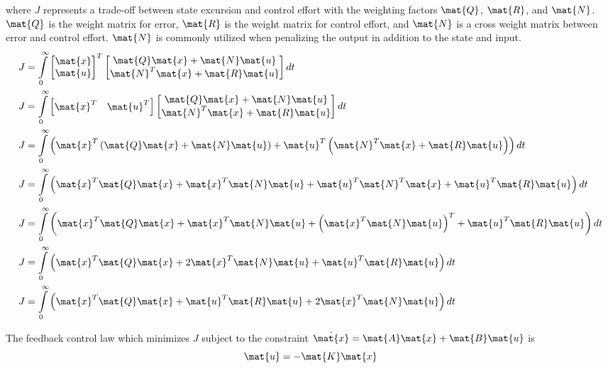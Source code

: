 where $J$ represents a trade-off between \gls{state} excursion and
\gls{control effort} with the weighting factors $\mat{Q}$, $\mat{R}$, and
$\mat{N}$. $\mat{Q}$ is the weight matrix for \gls{error}, $\mat{R}$ is the
weight matrix for \gls{control effort}, and $\mat{N}$ is a cross weight matrix
between \gls{error} and \gls{control effort}. $\mat{N}$ is commonly utilized
when penalizing the output in addition to the state and input.
\begin{align*}
  J &= \int\limits_0^\infty
    \begin{bmatrix}
      \mat{x} \\
      \mat{u}
    \end{bmatrix}^T
    \begin{bmatrix}
      \mat{Q}\mat{x} + \mat{N}\mat{u} \\
      \mat{N}^T\mat{x} + \mat{R}\mat{u}
    \end{bmatrix} dt \\
  J &= \int\limits_0^\infty
    \begin{bmatrix}
      \mat{x}^T & \mat{u}^T
    \end{bmatrix}
    \begin{bmatrix}
      \mat{Q}\mat{x} + \mat{N}\mat{u} \\
      \mat{N}^T\mat{x} + \mat{R}\mat{u}
    \end{bmatrix} dt \\
  J &= \int\limits_0^\infty
    \left(\mat{x}^T\left(\mat{Q}\mat{x} + \mat{N}\mat{u}\right) +
      \mat{u}^T\left(\mat{N}^T\mat{x} + \mat{R}\mat{u}\right)\right) dt \\
  J &= \int\limits_0^\infty
    \left(\mat{x}^T\mat{Q}\mat{x} + \mat{x}^T\mat{N}\mat{u} +
      \mat{u}^T\mat{N}^T\mat{x} + \mat{u}^T\mat{R}\mat{u}\right) dt \\
  J &= \int\limits_0^\infty
    \left(\mat{x}^T\mat{Q}\mat{x} + \mat{x}^T\mat{N}\mat{u} +
      \left(\mat{x}^T\mat{N}\mat{u}\right)^T + \mat{u}^T\mat{R}\mat{u}\right)
    dt \\
  J &= \int\limits_0^\infty
    \left(\mat{x}^T\mat{Q}\mat{x} + 2\mat{x}^T\mat{N}\mat{u} +
      \mat{u}^T\mat{R}\mat{u}\right) dt \\
  J &= \int\limits_0^\infty
    \left(\mat{x}^T\mat{Q}\mat{x} + \mat{u}^T\mat{R}\mat{u} +
      2\mat{x}^T\mat{N}\mat{u}\right) dt
\end{align*}

The feedback \gls{control law} which minimizes $J$ subject to the constraint
$\dot{\mat{x}} = \mat{A}\mat{x} + \mat{B}\mat{u}$ is
\begin{equation*}
  \mat{u} = -\mat{K}\mat{x}
\end{equation*}

